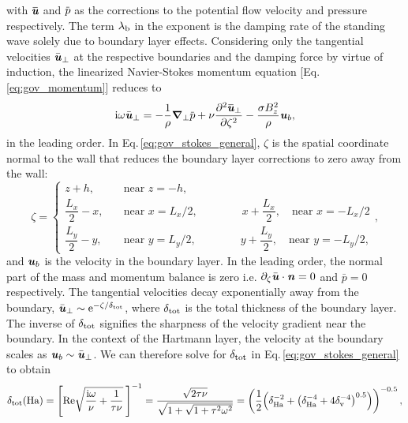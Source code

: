 \documentclass[aps,prfluids,reprint,superscriptaddress]{revtex4-2}
\newcommand{\h}[1]{\textbf{\textit{#1}}}
\newcommand{\ii}[1]{\text{#1}}
\newcommand{\overbar}[1]{\mkern 1.5mu\overline{\mkern-2mu#1\mkern-2mu}\mkern 1.5mu}
\begin{document}
with ${\overbar{\h u}}$ and ${\overbar{p}}$ as the corrections to the potential flow velocity and pressure respectively. The term $\lambda_{\rm b}$ in the exponent is the damping rate of the standing wave solely due to boundary layer effects. Considering only the tangential velocities ${\bar{\h u}}_{\perp}$ at the respective boundaries and the damping force by virtue of induction, the linearized Navier-Stokes momentum equation [Eq.\,\eqref{eq:gov_momentum}] reduces to
\begin{equation}
	\ii{i}\omega {\bar{\h u}}_{\perp} = -\frac{1}{\rho}\bm\nabla_{\perp}{\overbar{p}} 
	+ \nu\pdv[2]{{\overbar{\h u}}_{\perp}}{\zeta}
	- \frac{\sigma B_z^2}{\rho} {{\h u}}_{b} ,
	\label{eq:gov_stokes_general}
\end{equation}
in the leading order. In Eq.\,\eqref{eq:gov_stokes_general}, $\zeta$ is the spatial coordinate normal to the wall that reduces the boundary layer corrections to zero away from the wall:
\begin{equation}
	\zeta = \begin{cases}
		z + h, \quad &\text{near } z=-h, \\
		\dfrac{L_x}{2} - x, \quad &\text{near } x = L_x/2, \qquad\qquad
		x + \dfrac{L_x}{2}, \quad \text{near } x = -L_x/2 \\[5pt]
		\dfrac{L_y}{2} - y, \quad &\text{near } y = L_y/2, \qquad\qquad
		y + \dfrac{L_y}{2}, \quad \text{near } y = -L_y/2,
	\end{cases} ,
\end{equation}
and ${{\h u}}_{b}$ is the velocity in the boundary layer. In the leading order, the normal part of the mass and momentum balance is zero i.e. $\partial_\zeta {\bar{\h u}} \cdot \h n = 0$ and ${\bar{p}} = 0$ respectively. The tangential velocities decay exponentially away from the boundary, ${\bar{\h u}}_{\perp} \sim \ii e^{-\zeta/\delta_{\rm tot}}$, where $\delta_{\rm tot}$ is the total thickness of the boundary layer. The inverse of $\delta_{\rm tot}$ signifies the sharpness of the velocity gradient near the boundary. In the context of the Hartmann layer, the velocity at the boundary scales as ${{\h u}}_{b} \sim {\bar{\h u}}_{\perp}$. We can therefore solve for $\delta_{\rm tot}$ in Eq.\,\eqref{eq:gov_stokes_general} to obtain
\begin{equation}
	\delta_{\rm tot} (\ii{Ha}) =
	\left[
	\ii{Re}\sqrt{\dfrac{\ii i\omega}{\nu} + \dfrac{1}{\tau\nu} }
	\:\right]^{-1}
	=\frac{\sqrt{2\tau\nu}}{\sqrt{1+\sqrt{1+\tau^2\omega^2}}}
	= 
	\left( \frac{1}{2} \Bigl(
	\delta_{\rm Ha}^{-2} + \left( \delta_{\rm Ha}^{-4} + 4\delta_{\rm v}^{-4}\right)^{0.5} \Bigr)
	\right)^{-0.5}
	,
	\label{eq:hartmann_layer_thickness}
\end{equation}
\end{document}
